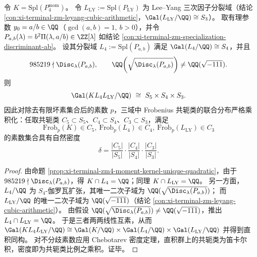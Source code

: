\begin{corollary}\label{cor:xi-zm4-moment-kernel-leyang-s4-s3-s5-chebotarev-triple-product}
令 \(K=\mathrm{Spl}(P_4^{\mathrm{mom}})\)。
令
\(
L_{\mathrm{LY}}:=\mathrm{Spl}(P_{\mathrm{LY}})
\)
为 Lee--Yang 三次因子分裂域（结论 \ref{con:xi-terminal-zm-leyang-cubic-arithmetic}，\(\Gal(L_{\mathrm{LY}}/\QQ)\cong S_3\)）。
取有理参数 \(y_0=a/b\in\QQ\)（\(\gcd(a,b)=1,\ b>0\)），并令
\(
P_{a,b}(\lambda)=b^{2}\Pi(\lambda,a/b)\in\ZZ[\lambda]
\)
如结论 \ref{con:xi-terminal-zm-specialization-discriminant-ab}。
设其分裂域 \(L_4:=\mathrm{Spl}(P_{a,b})\) 满足 \(\Gal(L_4/\QQ)\cong S_4\)，并且
\[
985219\nmid \Disc_{\lambda}(P_{a,b}),
\qquad
\QQ\!\left(\sqrt{\Disc_{\lambda}(P_{a,b})}\right)\neq \QQ(\sqrt{-111}).
\]
则
\[
\Gal(KL_4L_{\mathrm{LY}}/\QQ)\ \cong\ S_{5}\times S_{4}\times S_{3}.
\]
因此对除去有限坏素集合后的素数 \(p\)，三域中 Frobenius 共轭类的联合分布严格乘积化：任取共轭类
\(
C_5\subset S_5
\)、\(
C_4\subset S_4
\)、\(
C_3\subset S_3
\)，满足
\[
\mathrm{Frob}_p(K)\in C_5,\ \mathrm{Frob}_p(L_4)\in C_4,\ \mathrm{Frob}_p(L_{\mathrm{LY}})\in C_3
\]
的素数集合具有自然密度
\[
\delta
=\frac{|C_5|}{|S_5|}\cdot\frac{|C_4|}{|S_4|}\cdot\frac{|C_3|}{|S_3|}.
\]
\end{corollary}
\begin{proof}
由命题 \ref{prop:xi-terminal-zm4-moment-kernel-unique-quadratic}，由于 \(985219\nmid \Disc_{\lambda}(P_{a,b})\)，得 \(K\cap L_4=\QQ\)；同理 \(K\cap L_{\mathrm{LY}}=\QQ\)。
另一方面，\(L_4/\QQ\) 为 \(S_4\)-伽罗瓦扩张，其唯一二次子域为 \(\QQ(\sqrt{\Disc_{\lambda}(P_{a,b})})\)；
而 \(L_{\mathrm{LY}}/\QQ\) 的唯一二次子域为 \(\QQ(\sqrt{-111})\)（结论 \ref{con:xi-terminal-zm-leyang-cubic-arithmetic}）。
由假设 \(\QQ(\sqrt{\Disc_{\lambda}(P_{a,b})})\neq \QQ(\sqrt{-111})\)，推出 \(L_4\cap L_{\mathrm{LY}}=\QQ\)。
于是三者两两线性互素，从而
\(
\Gal(KL_4L_{\mathrm{LY}}/\QQ)\cong \Gal(K/\QQ)\times \Gal(L_4/\QQ)\times \Gal(L_{\mathrm{LY}}/\QQ)
\)
并得到直积同构。
对不分歧素数应用 Chebotarev 密度定理，直积群上的共轭类为笛卡尔积，密度即为共轭类比例之乘积。证毕。
\end{proof}

